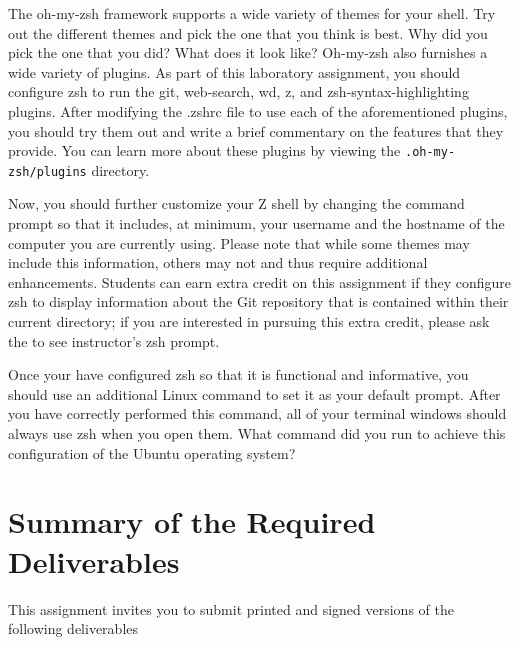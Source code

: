 The oh-my-zsh framework supports a wide variety of themes for your shell.  Try out the different themes and pick the one that you
think is best.  Why did you pick the one that you did? What does it look like? Oh-my-zsh also furnishes a wide variety of plugins.
As part of this laboratory assignment, you should configure zsh to run the git, web-search, wd, z, and zsh-syntax-highlighting
plugins.  After modifying the .zshrc file to use each of the aforementioned plugins, you should try them out and write a brief
commentary on the features that they provide. You can learn more about these plugins by viewing the {\tt .oh-my-zsh/plugins}
directory.

Now, you should further customize your Z shell by changing the command prompt so that it includes, at minimum, your username and
the hostname of the computer you are currently using.  Please note that while some themes may include this information, others may
not and thus require additional enhancements.  Students can earn extra credit on this assignment if they configure zsh to display
information about the Git repository that is contained within their current directory; if you are interested in pursuing this
extra credit, please ask the to see instructor's zsh prompt.

Once your have configured zsh so that it is functional and informative, you should use an additional Linux command to set it as
your default prompt.  After you have correctly performed this command, all of your terminal windows should always use zsh when you
open them.  What command did you run to achieve this configuration of the Ubuntu operating system?


\section*{Summary of the Required Deliverables}

This assignment invites you to submit printed and signed versions of the following deliverables 

